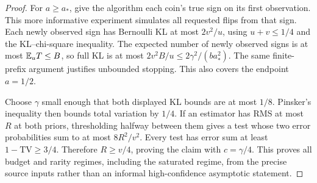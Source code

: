 \begin{proof}
For $a\ge a_*$, give the algorithm each coin's true sign on its first
observation. This more informative experiment simulates all requested flips
from that sign. Each newly observed sign has Bernoulli KL at most $2v^2/u$,
using $u+v\le1/4$ and the KL--chi-square inequality. The expected number of
newly observed signs is at most $\mathbb E_u T\le B$, so full KL is at most
$2v^2B/u\le2\gamma^2/(ba_*^2)$. The same finite-prefix argument justifies
unbounded stopping. This also covers the endpoint $a=1/2$.

Choose $\gamma$ small enough that both displayed KL bounds are at most $1/8$.
Pinsker's inequality then bounds total variation by $1/4$. If an estimator has
RMS at most $R$ at both priors, thresholding halfway between them gives a test
whose two error probabilities sum to at most $8R^2/v^2$. Every test has error
sum at least $1-\mathrm{TV}\ge3/4$. Therefore $R\ge v/4$, proving the claim
with $c=\gamma/4$. This proves all budget and rarity regimes, including the
saturated regime, from the precise source inputs rather than an informal
high-confidence asymptotic statement.
\end{proof}

